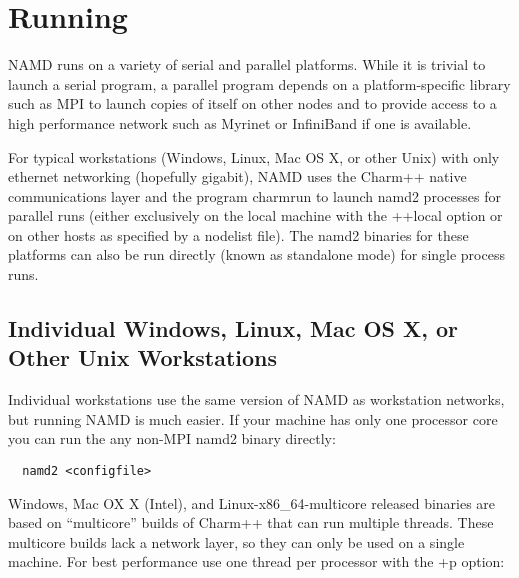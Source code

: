 
\section{Running \NAMD}
\label{section:run}

NAMD runs on a variety of serial and parallel platforms.  While it is
trivial to launch a serial program, a parallel program depends on a
platform-specific library such as MPI to launch copies of itself on
other nodes and to provide access to a high performance network such
as Myrinet or InfiniBand if one is available.

For typical workstations (Windows, Linux, Mac OS X, or other Unix)
with only ethernet networking (hopefully gigabit), NAMD uses the
Charm++ native communications layer and the program charmrun to launch
namd2 processes for parallel runs (either exclusively on the local
machine with the ++local option or on other hosts as specified by a
nodelist file).  The namd2 binaries for these platforms can also be
run directly (known as standalone mode) for single process runs.

\subsection{Individual Windows, Linux, Mac OS X, or Other Unix Workstations}

Individual workstations use the same version of NAMD as workstation
networks, but running NAMD is much easier.  If your machine has only
one processor core you can run the any non-MPI namd2 binary directly:

\begin{verbatim}
  namd2 <configfile>
\end{verbatim}

Windows, Mac OX X (Intel), and Linux-x86\_64-multicore released binaries
are based on ``multicore'' builds of Charm++ that can run multiple threads.
These multicore builds lack a network layer, so they can only be used on a
single machine.
For best performance use one thread per processor with the +p option:


